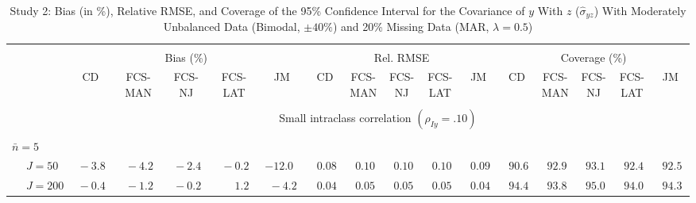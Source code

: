 \begin{sidewaystable}
\begin{threeparttable}
\setlength{\tabcolsep}{1.0pt}
\renewcommand{\arraystretch}{0.95}
\footnotesize
\caption{\small Study 2: Bias (in \%), Relative RMSE, and Coverage of the 95\% Confidence Interval for the Covariance of $y$ With $z$ ($\hat\sigma_{yz}$) With Moderately Unbalanced Data (Bimodal, $\pm 40\%$) and 20\% Missing Data (MAR, $\lambda=0.5$)}
\begin{tabular}{llccccccccccccccc}
\hline\\[-1.8ex]
& & \multicolumn{5}{c}{Bias (\%)} & \multicolumn{5}{c}{Rel. RMSE} & \multicolumn{5}{c}{Coverage (\%)} \\ \cmidrule(r){3-7}\cmidrule(r){8-12}\cmidrule(r){13-17}
 &  & CD & \makecell{FCS-\\MAN} & \makecell{FCS-\\NJ} & \makecell{FCS-\\LAT} & JM & CD & \makecell{FCS-\\MAN} & \makecell{FCS-\\NJ} & \makecell{FCS-\\LAT} & JM & CD & \makecell{FCS-\\MAN} & \makecell{FCS-\\NJ} & \makecell{FCS-\\LAT} & \multicolumn{1}{c}{JM} \\ 
[0.4ex]\hline\\[-1.8ex]
& & \multicolumn{15}{c}{Small intraclass correlation $(\rho_{Iy}=.10)$} \\[0.6ex]\hline\\[-1.8ex]
\multicolumn{4}{l}{$\bar{n}=5$} \\  & \nopagebreak $\;J=50$  & $\phantom{0}{-}3.8\phantom{0}$ & $\phantom{0}{-}4.2\phantom{0}$ & $\phantom{0}{-}2.4\phantom{0}$ & $\phantom{0}{-}0.2\phantom{0}$ & ${-}12.0\phantom{0}$ & $\phantom{0}0.08\phantom{0}$ & $\phantom{0}0.10\phantom{0}$ & $\phantom{0}0.10\phantom{0}$ & $\phantom{0}0.10\phantom{0}$ & $\phantom{0}0.09\phantom{0}$ & $\phantom{0}90.6\phantom{0}$ & $\phantom{0}92.9\phantom{0}$ & $\phantom{0}93.1\phantom{0}$ & $\phantom{0}92.4\phantom{0}$ & $\phantom{0}92.5\phantom{0}$ \\
 & \nopagebreak $\;J=200$  & $\phantom{0}{-}0.4\phantom{0}$ & $\phantom{0}{-}1.2\phantom{0}$ & $\phantom{0}{-}0.2\phantom{0}$ & $\phantom{0}\phantom{-}1.2\phantom{0}$ & $\phantom{0}{-}4.2\phantom{0}$ & $\phantom{0}0.04\phantom{0}$ & $\phantom{0}0.05\phantom{0}$ & $\phantom{0}0.05\phantom{0}$ & $\phantom{0}0.05\phantom{0}$ & $\phantom{0}0.04\phantom{0}$ & $\phantom{0}94.4\phantom{0}$ & $\phantom{0}93.8\phantom{0}$ & $\phantom{0}95.0\phantom{0}$ & $\phantom{0}94.0\phantom{0}$ & $\phantom{0}94.3\phantom{0}$ \\

\end{tabular}
\end{threeparttable}
\end{sidewaystable}
